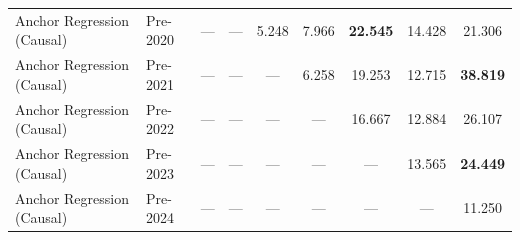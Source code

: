 \begin{table}[htbp]
{\begin{tabular}{l lccccccc}
Anchor Regression (Causal) & Pre-2020 & --- & --- & 5.248 & 7.966 & \textbf{22.545} & 14.428 & 21.306 \\
Anchor Regression (Causal) & Pre-2021 & --- & --- & --- & 6.258 & 19.253 & 12.715 & \textbf{38.819} \\
Anchor Regression (Causal) & Pre-2022 & --- & --- & --- & --- & 16.667 & 12.884 & 26.107 \\
Anchor Regression (Causal) & Pre-2023 & --- & --- & --- & --- & --- & 13.565 & \textbf{24.449} \\
Anchor Regression (Causal) & Pre-2024 & --- & --- & --- & --- & --- & --- & 11.250 \\
\bottomrule
\end{tabular}%
}
\end{table}